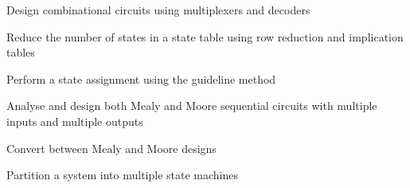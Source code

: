 \documentclass[options]{article}
\newcommand{\cmark}{\ding{51}}%
\newcommand{\done}{\rlap{$\square$}{\raisebox{2pt}{\large\hspace{1pt}\cmark}}%
  \hspace{-2.5pt}}
\begin{document}
\begin{todolist}
  \item Design combinational circuits using multiplexers and decoders
  \item Reduce the number of states in a state table using row reduction and implication tables
  \item Perform a state assignment using the guideline method
  \item Analyse and design both Mealy and Moore sequential circuits with multiple inputs and multiple outputs
  \item Convert between Mealy and Moore designs
  \item Partition a system into multiple state machines
\end{todolist}

\end{document}
